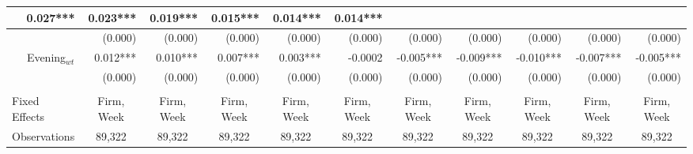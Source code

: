 \begin{table}
{\begin{tabular}{rrrrrrrrrrr}
  \multicolumn{1}{r|}{0.027***} &
  \multicolumn{1}{r|}{0.023***} &
  \multicolumn{1}{r|}{0.019***} &
  \multicolumn{1}{r|}{0.015***} &
  \multicolumn{1}{r|}{0.014***} &
  \multicolumn{1}{r|}{0.014***} \\ \hline
\multicolumn{1}{|r|}{} &
  \multicolumn{1}{r|}{(0.000)} &
  \multicolumn{1}{r|}{(0.000)} &
  \multicolumn{1}{r|}{(0.000)} &
  \multicolumn{1}{r|}{(0.000)} &
  \multicolumn{1}{r|}{(0.000)} &
  \multicolumn{1}{r|}{(0.000)} &
  \multicolumn{1}{r|}{(0.000)} &
  \multicolumn{1}{r|}{(0.000)} &
  \multicolumn{1}{r|}{(0.000)} &
  \multicolumn{1}{r|}{(0.000)} \\ \hline
\multicolumn{1}{|r|}{Evening$_{wt}$} &
  \multicolumn{1}{r|}{0.012***} &
  \multicolumn{1}{r|}{0.010***} &
  \multicolumn{1}{r|}{0.007***} &
  \multicolumn{1}{r|}{0.003***} &
  \multicolumn{1}{r|}{-0.0002} &
  \multicolumn{1}{r|}{-0.005***} &
  \multicolumn{1}{r|}{-0.009***} &
  \multicolumn{1}{r|}{-0.010***} &
  \multicolumn{1}{r|}{-0.007***} &
  \multicolumn{1}{r|}{-0.005***} \\ \hline
\multicolumn{1}{|r|}{} &
  \multicolumn{1}{r|}{(0.000)} &
  \multicolumn{1}{r|}{(0.000)} &
  \multicolumn{1}{r|}{(0.000)} &
  \multicolumn{1}{r|}{(0.000)} &
  \multicolumn{1}{r|}{(0.000)} &
  \multicolumn{1}{r|}{(0.000)} &
  \multicolumn{1}{r|}{(0.000)} &
  \multicolumn{1}{r|}{(0.000)} &
  \multicolumn{1}{r|}{(0.000)} &
  \multicolumn{1}{r|}{(0.000)} \\ \hline
\multicolumn{1}{l}{} &
  \multicolumn{1}{l}{} &
  \multicolumn{1}{l}{} &
  \multicolumn{1}{l}{} &
  \multicolumn{1}{l}{} &
  \multicolumn{1}{l}{} &
  \multicolumn{1}{l}{} &
  \multicolumn{1}{l}{} &
  \multicolumn{1}{l}{} &
  \multicolumn{1}{l}{} &
  \multicolumn{1}{l}{} \\ \hline
\multicolumn{1}{|l|}{Fixed Effects} &
  \multicolumn{1}{c|}{Firm, Week} &
  \multicolumn{1}{c|}{Firm, Week} &
  \multicolumn{1}{c|}{Firm, Week} &
  \multicolumn{1}{c|}{Firm, Week} &
  \multicolumn{1}{c|}{Firm, Week} &
  \multicolumn{1}{c|}{Firm, Week} &
  \multicolumn{1}{c|}{Firm, Week} &
  \multicolumn{1}{c|}{Firm, Week} &
  \multicolumn{1}{c|}{Firm, Week} &
  \multicolumn{1}{c|}{Firm, Week} \\ \hline
\multicolumn{1}{|l|}{Observations} &
  \multicolumn{1}{c|}{89,322} &
  \multicolumn{1}{c|}{89,322} &
  \multicolumn{1}{c|}{89,322} &
  \multicolumn{1}{c|}{89,322} &
  \multicolumn{1}{c|}{89,322} &
  \multicolumn{1}{c|}{89,322} &
  \multicolumn{1}{c|}{89,322} &
  \multicolumn{1}{c|}{89,322} &
  \multicolumn{1}{c|}{89,322} &
  \multicolumn{1}{c|}{89,322} \\ \hline

\end{tabular}}
\end{table}
